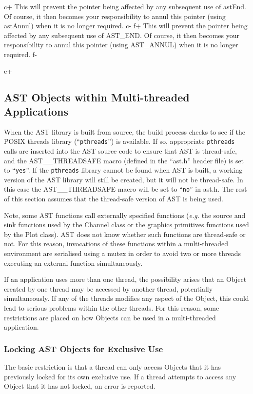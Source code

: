 \documentclass[twoside,11pt]{article}
\begin{document}
c+
This will prevent the pointer being affected by any subsequent use of
astEnd. Of course, it then becomes your responsibility to annul this
pointer (using astAnnul) when it is no longer required.
c-
f+
This will prevent the pointer being affected by any subsequent use of
AST\_END. Of course, it then becomes your responsibility to annul this
pointer (using AST\_ANNUL) when it is no longer required.
f-


c+
\subsection{AST Objects within Multi-threaded Applications}

When the AST library is built from source, the build process checks to
see if the POSIX threads library (``{\tt pthreads}'') is available. If so,
appropriate {\tt pthreads} calls are inserted into the AST source code to
ensure that AST is thread-safe, and the AST\_\_THREADSAFE macro (defined
in the ``ast.h'' header file) is set to ``{\tt yes}''. If the {\tt pthreads}
library cannot be found when AST is built, a working version of the AST 
library will still be created, but it will not be thread-safe. In this
case the AST\_\_THREADSAFE macro will be set to ``{\tt no}'' in ast.h. The
rest of this section assumes that the thread-safe version of AST is being
used.

Note, some AST functions call externally specified functions (\emph{e.g.}
the source and sink functions used by the Channel class or the graphics
primitives functions used by the Plot class). AST does not know whether
such functions are thread-safe or not. For this reason, invocations of these
functions within a multi-threaded environment are serialised using a mutex
in order to avoid two or more threads executing an external function 
simultaneously.

If an application uses more than one thread, the possibility arises that 
an Object created by one thread may be accessed by another thread, potentially
simultaneously. If any of the threads modifies any aspect of the Object,
this could lead to serious problems within the other threads. For this
reason, some restrictions are placed on how Objects can be used in a
multi-threaded application.

\subsubsection{Locking AST Objects for Exclusive Use}
The basic restriction is that a thread can only access Objects that it
has previously locked for its own exclusive use. If a thread attempts to
access any Object that it has not locked, an error is reported. 
\end{document}
